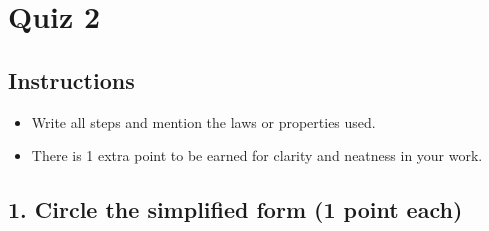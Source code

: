 \documentclass{hw}
\begin{document}
\section*{Quiz 2}

\subsection*{\normalsize Instructions}
\begin{itemize}
    \item Write all steps and mention the laws or properties used.
    \item There is 1 extra point to be earned for clarity and neatness in your work.
\end{itemize}

\subsection*{\normalsize 1. Circle the simplified form (1 point each)}
\end{document}
